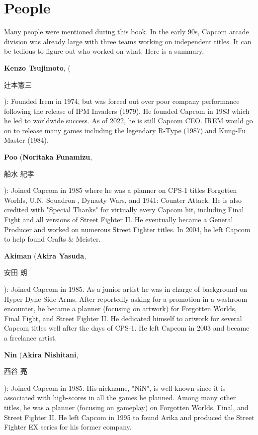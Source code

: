 \chapter{People} 
\label{people}

Many people were mentioned during this book. In the early 90s, Capcom arcade division was already large with three teams working on independent titles. It can be tedious to figure out who worked on what. Here is a summary.

\textbf{Kenzo Tsujimoto}, (\begin{CJK}{UTF8}{min}辻本憲三\end{CJK}): Founded Irem in 1974, but was forced out over poor company performance following the release of IPM Invaders (1979). He founded Capcom in 1983 which he led to worldwide success. As of 2022, he is still Capcom CEO. IREM would go on to release many games including the legendary R-Type (1987) and Kung-Fu Master (1984). 

\textbf{Poo} (\textbf{Noritaka Funamizu}, \begin{CJK}{UTF8}{min}船水 紀孝\end{CJK}): Joined Capcom in 1985 where he was a planner on CPS-1 titles Forgotten Worlds, U.N. Squadron , Dynasty Wars, and 1941: Counter Attack. He is also credited with "Special Thanks" for virtually every Capcom hit, including Final Fight and all versions of Street Fighter II. He eventually became a General Producer and worked on numerous Street Fighter titles. In 2004, he left Capcom to help found Crafts \& Meister.

\textbf{Akiman} (\textbf{Akira Yasuda}, \begin{CJK}{UTF8}{min}安田 朗\end{CJK}): Joined Capcom in 1985. As a junior artist he was in charge of background on Hyper Dyne Side Arms. After reportedly asking for a promotion in a washroom encounter, he became a planner (focusing on artwork) for Forgotten Worlds, Final Fight, and Street Fighter II. He dedicated himself to artwork for several Capcom titles well after the days of CPS-1. He left Capcom in 2003 and became a freelance artist.

\textbf{Nin} (\textbf{Akira Nishitani}, \begin{CJK}{UTF8}{min}西谷 亮\end{CJK}): Joined Capcom in 1985. His nickname, "NiN", is well known since it is associated with high-scores in all the games he planned. Among many other titles, he was a planner (focusing on gameplay) on Forgotten Worlds, Final, and Street Fighter II. He left Capcom in 1995 to found Arika and produced the Street Fighter EX series for his former company.

